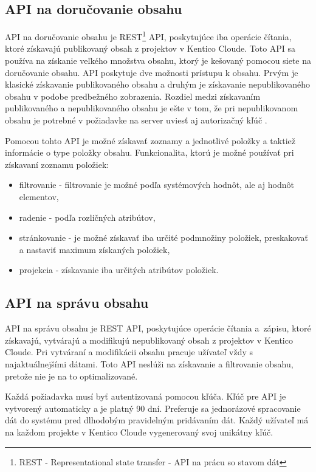 \documentclass[
  printed, %
  table,   %
  lof,     %
  nolot,     %
  twoside,  
]{fithesis3}
\begin{document}
\subsection{API na doručovanie obsahu}
API na doručovanie obsahu je REST\footnote{REST - Representational state transfer - API na prácu so stavom dát} API, poskytujúce iba operácie čítania, ktoré získavajú publikovaný obsah z projektov v Kentico Cloude. Toto API sa používa na získanie veľkého množstva obsahu, ktorý je kešovaný pomocou siete na doručovanie obsahu. API poskytuje dve možnosti prístupu k obsahu. Prvým je klasické získavanie publikovaného obsahu a druhým je získavanie nepublikovaného obsahu v podobe predbežného zobrazenia. Rozdiel medzi získavaním publikovaného a nepublikovaného obsahu je ešte v tom, že pri nepublikovanom obsahu je potrebné v požiadavke na server uviesť aj autorizačný kľúč \cite{delivery}. 

Pomocou tohto API je možné získavať zoznamy a jednotlivé položky a taktiež informácie o type položky obsahu. Funkcionalita, ktorú je možné používať pri získavaní zoznamu položiek:
\begin{itemize}
	\item filtrovanie - filtrovanie je možné podľa systémových hodnôt, ale aj hodnôt elementov,
	\item radenie - podľa rozličných atribútov,
	\item stránkovanie - je možné získavať iba určité podmnožiny položiek, preskakovať a nastaviť maximum získaných položiek,
	\item projekcia - získavanie iba určitých atribútov položiek.
\end{itemize}
\subsection{API na správu obsahu}
API na správu obsahu je REST API, poskytujúce operácie čítania a~zápisu, ktoré získavajú, vytvárajú a modifikujú nepublikovaný obsah z projektov v Kentico Cloude. Pri vytváraní a modifikácii obsahu pracuje užívateľ vždy s najaktuálnejšími dátami. Toto API neslúži na získavanie a filtrovanie obsahu, pretože nie je na to optimalizované.

Každá požiadavka musí byť autentizovaná pomocou kľúča. Kľúč pre API je vytvorený automaticky a je platný 90 dní. 
Preferuje sa jednorázové spracovanie dát do systému pred dlhodobým pravidelným pridávaním dát. Každý užívateľ má na každom projekte v Kentico Cloude vygenerovaný svoj unikátny kľúč.
\end{document}
